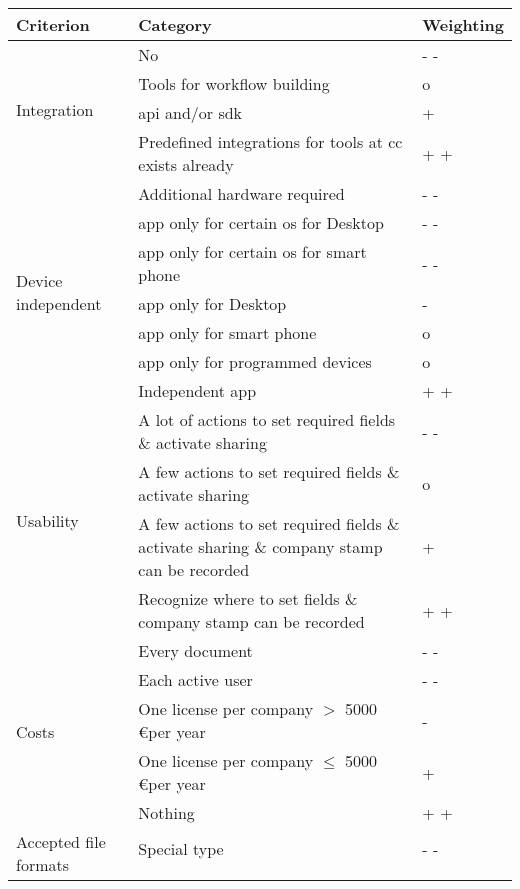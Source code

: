	\begin{longtable}{|p{4cm}|p{9cm}|p{1.5cm}|} \hline
		Criterion & Category & Weighting \\ \hline
		\multirow{4}{*}{Integration} & No & - - \\ \cline{2-3}
									& Tools for workflow building & o \\ \cline{2-3}
									& \Gls{api} and/or \gls{sdk} & + \\ \cline{2-3}
									& Predefined integrations for tools at \gls{cc} exists already & + + \\ \hline
		\multirow{7}{*}{Device independent} & Additional hardware required & - - \\ \cline{2-3}
											& \Gls{app} only for certain \gls{os} for Desktop & - - \\ \cline{2-3}
											& \Gls{app} only for certain \gls{os} for smart phone & - - \\ \cline{2-3} 
											& \Gls{app} only for Desktop & - \\ \cline{2-3}
											& \Gls{app} only for smart phone & o \\ \cline{2-3}
											& \Gls{app} only for programmed devices & o \\ \cline{2-3}
											& Independent \gls{app} & + + \\ \hline
		\multirow{4}{*}{Usability} & A lot of actions to set required fields \& activate sharing & - - \\ \cline{2-3}
								    & A few actions to set required fields \& activate sharing & o \\ \cline{2-3}
									& A few actions to set required fields \& activate sharing \& company stamp can be recorded & + \\ \cline{2-3}
									& Recognize where to set fields \& company stamp can be recorded & + + \\ \hline
		\multirow{5}{*}{Costs}  & Every document & - - \\ \cline{2-3}
								& Each active user & - - \\ \cline{2-3}
								& One license per company $>$ 5000 \euro per year & - \\ \cline{2-3}
								& One license per company $\leqslant$ 5000 \euro per year & + \\ \cline{2-3}
								& Nothing & + + \\ \hline
		\multirow{4}{*}{Accepted file formats} & Special type & - - \\ \cline{2-3}

\end{longtable}
